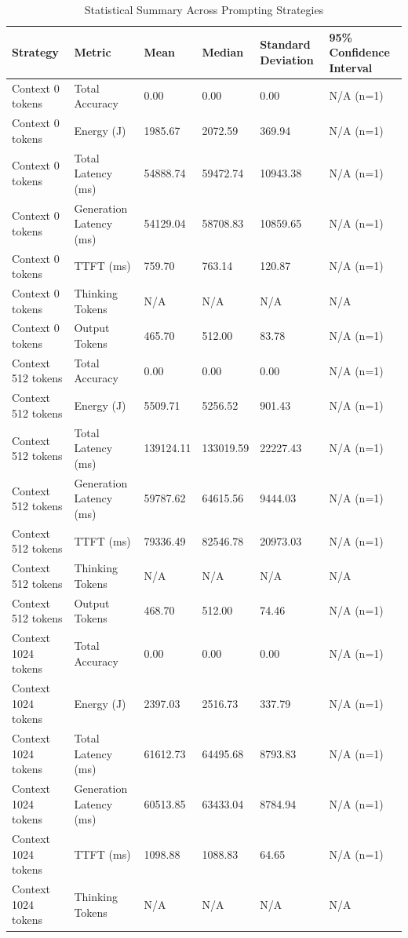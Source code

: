 \begin{table}
\caption{Statistical Summary Across Prompting Strategies}
\label{tab:statistical_summary}
\begin{tabular}{llllll}
\toprule
Strategy & Metric & Mean & Median & Standard Deviation & 95\% Confidence Interval \\
\midrule
Context 0 tokens & Total Accuracy & 0.00 & 0.00 & 0.00 & N/A (n=1) \\
Context 0 tokens & Energy (J) & 1985.67 & 2072.59 & 369.94 & N/A (n=1) \\
Context 0 tokens & Total Latency (ms) & 54888.74 & 59472.74 & 10943.38 & N/A (n=1) \\
Context 0 tokens & Generation Latency (ms) & 54129.04 & 58708.83 & 10859.65 & N/A (n=1) \\
Context 0 tokens & TTFT (ms) & 759.70 & 763.14 & 120.87 & N/A (n=1) \\
Context 0 tokens & Thinking Tokens & N/A & N/A & N/A & N/A \\
Context 0 tokens & Output Tokens & 465.70 & 512.00 & 83.78 & N/A (n=1) \\
Context 512 tokens & Total Accuracy & 0.00 & 0.00 & 0.00 & N/A (n=1) \\
Context 512 tokens & Energy (J) & 5509.71 & 5256.52 & 901.43 & N/A (n=1) \\
Context 512 tokens & Total Latency (ms) & 139124.11 & 133019.59 & 22227.43 & N/A (n=1) \\
Context 512 tokens & Generation Latency (ms) & 59787.62 & 64615.56 & 9444.03 & N/A (n=1) \\
Context 512 tokens & TTFT (ms) & 79336.49 & 82546.78 & 20973.03 & N/A (n=1) \\
Context 512 tokens & Thinking Tokens & N/A & N/A & N/A & N/A \\
Context 512 tokens & Output Tokens & 468.70 & 512.00 & 74.46 & N/A (n=1) \\
Context 1024 tokens & Total Accuracy & 0.00 & 0.00 & 0.00 & N/A (n=1) \\
Context 1024 tokens & Energy (J) & 2397.03 & 2516.73 & 337.79 & N/A (n=1) \\
Context 1024 tokens & Total Latency (ms) & 61612.73 & 64495.68 & 8793.83 & N/A (n=1) \\
Context 1024 tokens & Generation Latency (ms) & 60513.85 & 63433.04 & 8784.94 & N/A (n=1) \\
Context 1024 tokens & TTFT (ms) & 1098.88 & 1088.83 & 64.65 & N/A (n=1) \\
Context 1024 tokens & Thinking Tokens & N/A & N/A & N/A & N/A \\

\end{tabular}
\end{table}
